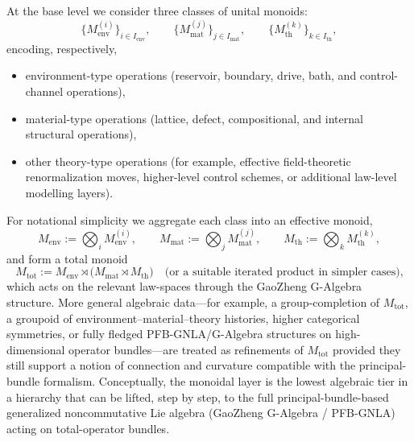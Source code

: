 \documentclass[11pt]{book}
\theoremstyle{plain}
\theoremstyle{definition}
\theoremstyle{remark}
\begin{document}
At the base level we consider three classes of unital monoids:
\begin{equation}
  \{M_{\mathrm{env}}^{(i)}\}_{i\in I_{\mathrm{env}}},
  \qquad
  \{M_{\mathrm{mat}}^{(j)}\}_{j\in I_{\mathrm{mat}}},
  \qquad
  \{M_{\mathrm{th}}^{(k)}\}_{k\in I_{\mathrm{th}}},
\end{equation}
encoding, respectively,
\begin{itemize}
  \item environment-type operations (reservoir, boundary, drive, bath,
        and control-channel operations),
  \item material-type operations (lattice, defect, compositional, and
        internal structural operations),
  \item other theory-type operations (for example, effective
        field-theoretic renormalization moves, higher-level control
        schemes, or additional law-level modelling layers).
\end{itemize}
For notational simplicity we aggregate each class into an effective
monoid,
\begin{equation}
  M_{\mathrm{env}} := \bigotimes_{i} M_{\mathrm{env}}^{(i)},
  \qquad
  M_{\mathrm{mat}} := \bigotimes_{j} M_{\mathrm{mat}}^{(j)},
  \qquad
  M_{\mathrm{th}}  := \bigotimes_{k} M_{\mathrm{th}}^{(k)},
\end{equation}
and form a total monoid
\begin{equation}
  M_{\mathrm{tot}}
  :=
  M_{\mathrm{env}} \rtimes
  \bigl(M_{\mathrm{mat}} \rtimes M_{\mathrm{th}}\bigr)
  \quad
  \text{(or a suitable iterated product in simpler cases),}
\end{equation}
which acts on the relevant law-spaces through the GaoZheng G-Algebra
structure. More general algebraic data---for example, a group-completion
of $M_{\mathrm{tot}}$, a groupoid of environment--material--theory
histories, higher categorical symmetries, or fully fledged
PFB-GNLA/G-Algebra structures on high-dimensional operator bundles---are
treated as refinements of $M_{\mathrm{tot}}$ provided they still support
a notion of connection and curvature compatible with the principal-bundle
formalism. Conceptually, the monoidal layer is the lowest algebraic tier
in a hierarchy that can be lifted, step by step, to the full
principal-bundle-based generalized noncommutative Lie algebra
(GaoZheng G-Algebra / PFB-GNLA) acting on total-operator bundles.
\end{document}
